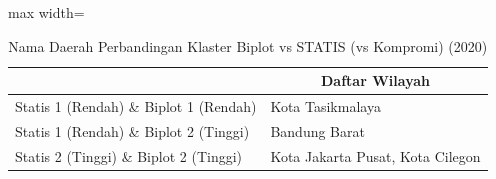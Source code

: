 \begin{table}[H]
\centering
\caption{Nama Daerah Perbandingan Klaster Biplot vs STATIS (vs Kompromi) (2020)} \label{tab:sample1biplot_statis_name_2020}
\begin{adjustbox}{max width=\textwidth}
\begin{tabular}{|>{\centering\arraybackslash}p{4cm}|p{10cm}|}
\hline
\multicolumn{1}{|c|}{\textbf{Kategori}} & \multicolumn{1}{c|}{\textbf{Daftar Wilayah}} \\
\hline
Statis 1 (Rendah) \& Biplot 1 (Rendah) & Kota Tasikmalaya \\
\hline
Statis 1 (Rendah) \& Biplot 2 (Tinggi) & Bandung Barat \\
\hline
Statis 2 (Tinggi) \& Biplot 2 (Tinggi) & Kota Jakarta Pusat, Kota Cilegon \\
\hline
\end{tabular}
\end{adjustbox}
\end{table}